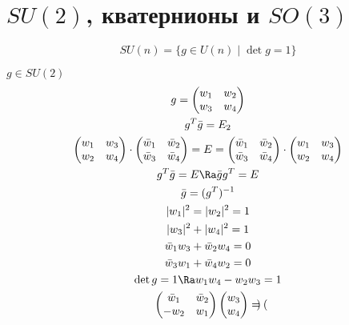 ﻿\section{\texorpdfstring{$SU(2)$}{SU(2)}, кватернионы и \texorpdfstring{$SO(3)$}{SO(3)}}

\begin{Def}
    \[ SU(n) = \{g \in U(n) \mid \det g = 1\} \]
\end{Def}
$g \in SU(2)$
\begin{gather*}
    g = \begin{pmatrix}
        w_1 & w_2 \\
        w_3 & w_4
    \end{pmatrix} \\
    g^T\bar g = E_2 \\
    \begin{pmatrix}
        w_1 & w_3 \\
        w_2 & w_4
    \end{pmatrix} \cdot \begin{pmatrix}
        \bar w_1 & \bar w_2 \\
        \bar w_3 & \bar w_4
    \end{pmatrix} = E = \begin{pmatrix}
        \bar w_1 & \bar w_2 \\
        \bar w_3 & \bar w_4
    \end{pmatrix} \cdot \begin{pmatrix}
        w_1 & w_3 \\
        w_2 & w_4
    \end{pmatrix} \\
    g^T\bar g = E \Ra \bar g g^T = E \\
    \bar g = (g^T)^{-1} \\
    |w_1|^2 = |w_2|^2 = 1 \\
    |w_3|^2 + |w_4|^2 = 1 \\
    \bar w_1w_3 + \bar w_2 w_4 = 0 \\
    \bar w_3w_1 + \bar w_4 w_2 = 0 \\
    \det g = 1 \Ra w_1w_4 - w_2w_3 = 1 \\
    \begin{pmatrix}
        \bar w_1 & \bar w_2 \\
        -w_2 & w_1
    \end{pmatrix}\begin{pmatrix}
        w_3 \\
        w_4
    \end{pmatrix} = \begin{pmatrix}

\end{pmatrix}
\end{gather*}
